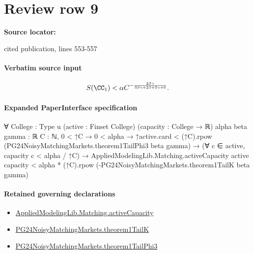 \documentclass[10pt]{article}
\begin{document}
\section*{Review row 9}
\textbf{Source locator:} {\footnotesize\raggedright cited publication, lines 553-\allowbreak{}557\par}
\paragraph{Verbatim source input}
\begin{ReviewVerbatim}
\begin{proposition}\label{prop:goose-1}
\begin{equation}
    S(\CC_1) < \alpha C^{-\frac{2\beta\gamma}{3\beta\gamma + 2\beta + 5\gamma + 6}}.
\end{equation}
\end{proposition}
\end{ReviewVerbatim}



\paragraph{Expanded PaperInterface specification}
\begin{ReviewVerbatim}
∀ {College : Type u} (active : Finset College) (capacity : College → ℝ) {alpha beta gamma : ℝ} {C : ℕ},
  0 < ↑C →
    0 < alpha →
      ↑active.card < (↑C).rpow (PG24NoisyMatchingMarkets.theorem1TailPhi3 beta gamma) →
        (∀ c ∈ active, capacity c < alpha / ↑C) →
          AppliedModelingLib.Matching.activeCapacity active capacity <
            alpha * (↑C).rpow (-PG24NoisyMatchingMarkets.theorem1TailK beta gamma)
\end{ReviewVerbatim}

\paragraph{Retained governing declarations}
\begin{itemize}\raggedright
\item \hyperlink{governing-declaration-e2b85f8e7da571f3}{Applied\allowbreak{}Modeling\allowbreak{}Lib.\allowbreak{}Matching.\allowbreak{}active\allowbreak{}Capacity}
\item \hyperlink{governing-declaration-293a20a9c7b67aee}{PG24\allowbreak{}Noisy\allowbreak{}Matching\allowbreak{}Markets.\allowbreak{}theorem1\allowbreak{}Tail\allowbreak{}K}
\item \hyperlink{governing-declaration-f214e532deafeb52}{PG24\allowbreak{}Noisy\allowbreak{}Matching\allowbreak{}Markets.\allowbreak{}theorem1\allowbreak{}Tail\allowbreak{}Phi3}
\end{itemize}
\end{document}
